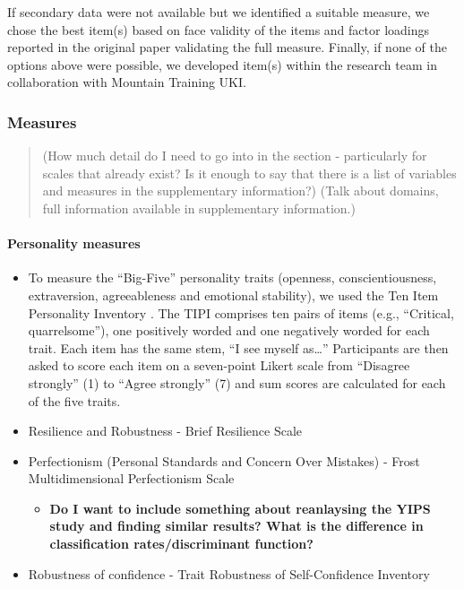\documentclass[a4paper,]{book}
\providecommand{\tightlist}{%
  \setlength{\itemsep}{0pt}\setlength{\parskip}{0pt}}
\let\oldparagraph\paragraph
\renewcommand{\paragraph}[1]{\oldparagraph{#1}\mbox{}}
\begin{document}
If secondary data were not available but we identified a suitable measure, we chose the best item(s) based on face validity of the items and factor loadings reported in the original paper validating the full measure. Finally, if none of the options above were possible, we developed item(s) within the research team in collaboration with Mountain Training UKI.

\hypertarget{measures-1}{%
\subsubsection{Measures}\label{measures-1}}

\begin{quote}
(How much detail do I need to go into in the section - particularly for scales that already exist? Is it enough to say that there is a list of variables and measures in the supplementary information?)
(Talk about domains, full information available in supplementary information.)
\end{quote}

\hypertarget{personality-measures}{%
\paragraph{Personality measures}\label{personality-measures}}

\begin{itemize}
\tightlist
\item
  To measure the ``Big-Five'' personality traits (openness, conscientiousness, extraversion, agreeableness and emotional stability), we used the Ten Item Personality Inventory \citep[TIPI;][]{Gosling2003}. The TIPI comprises ten pairs of items (e.g., ``Critical, quarrelsome''), one positively worded and one negatively worded for each trait. Each item has the same stem, ``I see myself as\ldots{}'' Participants are then asked to score each item on a seven-point Likert scale from ``Disagree strongly'' (1) to ``Agree strongly'' (7) and sum scores are calculated for each of the five traits.
\item
  Resilience and Robustness - Brief Resilience Scale \citep[BRS;][]{Smith2008}
\item
  Perfectionism (Personal Standards and Concern Over Mistakes) - Frost Multidimensional Perfectionism Scale \citep[FMPS;][]{Frost1990}

  \begin{itemize}
  \tightlist
  \item
    \textbf{Do I want to include something about reanlaysing the YIPS study and finding similar results? What is the difference in classification rates/discriminant function?}
  \end{itemize}
\item
  Robustness of confidence - Trait Robustness of Self-Confidence Inventory \citep[TROSCI;][]{Beattie2011}
\end{itemize}
\end{document}
